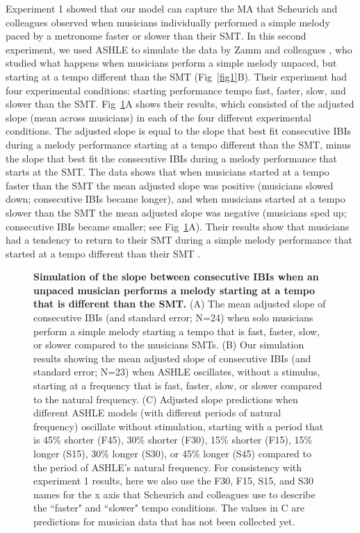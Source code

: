 \documentclass[10pt,letterpaper]{article}
\begin{document}
Experiment 1 showed that our model can capture the MA that Scheurich and colleagues \cite{scheurich2018tapping} observed when musicians individually performed a simple melody paced by a metronome faster or slower than their SMT. In this second experiment, we used ASHLE to simulate the data by Zamm and colleagues \cite{zamm2018musicians}, who studied what happens when musicians perform a simple melody unpaced, but starting at a tempo different than the SMT (Fig~\ref{fig1}B). Their experiment had four experimental conditions: starting performance tempo fast, faster, slow, and slower than the SMT. Fig~\ref{fig3}A shows their results, which consisted of the adjusted slope (mean across musicians) in each of the four different experimental conditions. The adjusted slope is equal to the slope that best fit consecutive IBIs during a melody performance starting at a tempo different than the SMT, minus the slope that best fit the consecutive IBIs during a melody performance that starts at the SMT. The data shows that when musicians started at a tempo faster than the SMT the mean adjusted slope was positive (musicians slowed down; consecutive IBIs became longer), and when musicians started at a tempo slower than the SMT the mean adjusted slope was negative (musicians sped up; consecutive IBIs became smaller; see Fig~\ref{fig3}A). Their results show that musicians had a tendency to return to their SMT during a simple melody performance that started at a tempo different than their SMT \cite{zamm2018musicians}. 

\begin{figure}[!h]
\caption{{\bf Simulation of the slope between consecutive IBIs when an unpaced musician performs a melody starting at a tempo that is different than the SMT.} (A) The mean adjusted slope of consecutive IBIs (and standard error; N=24) when solo musicians perform a simple melody starting a tempo that is fast, faster, slow, or slower compared to the musicians SMTs. (B) Our simulation results showing the mean adjusted slope of consecutive IBIs (and standard error; N=23) when ASHLE oscillates, without a stimulus, starting at a frequency that is fast, faster, slow, or slower compared to the natural frequency. (C) Adjusted slope predictions when different ASHLE models (with different periods of natural frequency) oscillate without stimulation, starting with a period that is 45\% shorter (F45), 30\% shorter (F30), 15\% shorter (F15), 15\% longer (S15), 30\% longer (S30), or 45\% longer (S45) compared to the period of ASHLE's natural frequency. For consistency with experiment 1 results, here we also use the F30, F15, S15, and S30 names for the x axis that Scheurich and colleagues \cite{scheurich2018tapping} use to describe the ``faster" and ``slower" tempo conditions. The values in C are predictions for musician data that has not been collected yet.}
\label{fig3}
\end{figure}
\end{document}
